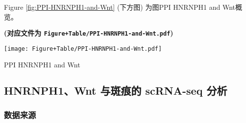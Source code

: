 \documentclass[
]{article}
\newenvironment{Shaded}{\begin{snugshade}}{\end{snugshade}}
\newcommand{\CommentTok}[1]{\textcolor[rgb]{0.56,0.35,0.01}{\textit{#1}}}
\newcommand{\DataTypeTok}[1]{\textcolor[rgb]{0.13,0.29,0.53}{#1}}
\newcommand{\KeywordTok}[1]{\textcolor[rgb]{0.13,0.29,0.53}{\textbf{#1}}}
\newcommand{\NormalTok}[1]{#1}
\newcommand{\OperatorTok}[1]{\textcolor[rgb]{0.81,0.36,0.00}{\textbf{#1}}}
\newcommand{\StringTok}[1]{\textcolor[rgb]{0.31,0.60,0.02}{#1}}
\begin{document}
Figure \ref{fig:PPI-HNRNPH1-and-Wnt} (下方图) 为图PPI HNRNPH1 and Wnt概览。

\textbf{(对应文件为 \texttt{Figure+Table/PPI-HNRNPH1-and-Wnt.pdf})}

\def\@captype{figure}
\begin{center}
\texttt{[image: Figure+Table/PPI-HNRNPH1-and-Wnt.pdf]}
\caption{PPI HNRNPH1 and Wnt}\label{fig:PPI-HNRNPH1-and-Wnt}
\end{center}

\hypertarget{hnrnph1wnt-ux4e0eux6591ux75d5ux7684-scrna-seq-ux5206ux6790-1}{%
\subsection{HNRNPH1、Wnt 与斑痕的 scRNA-seq 分析}\label{hnrnph1wnt-ux4e0eux6591ux75d5ux7684-scrna-seq-ux5206ux6790-1}}

\hypertarget{ux6570ux636eux6765ux6e90}{%
\subsubsection{数据来源}\label{ux6570ux636eux6765ux6e90}}

\begin{Shaded}
\end{Shaded}
\end{document}
